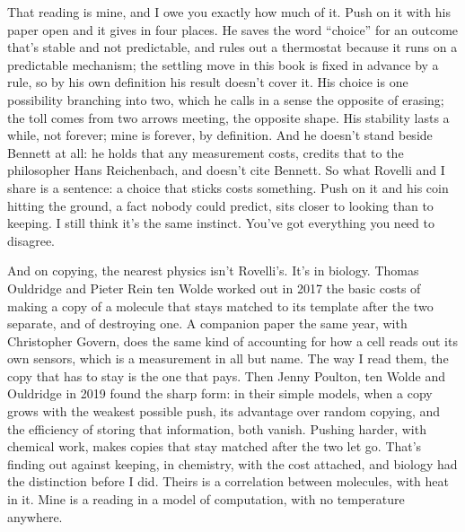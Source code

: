 \documentclass[11pt,twoside]{article}
\theoremstyle{thielethm}
\theoremstyle{thieledef}
\theoremstyle{thieledef}
\theoremstyle{thieledef}
\theoremstyle{thielethm}
\theoremstyle{thieleobs}
\theoremstyle{thielethm}
\begin{document}
That reading is mine, and I owe you exactly how much of it. Push on it with his paper open and it gives in four places. He saves the word ``choice'' for an outcome that's stable and not predictable, and rules out a thermostat because it runs on a predictable mechanism; the settling move in this book is fixed in advance by a rule, so by his own definition his result doesn't cover it. His choice is one possibility branching into two, which he calls in a sense the opposite of erasing; the toll comes from two arrows meeting, the opposite shape. His stability lasts a while, not forever; mine is forever, by definition. And he doesn't stand beside Bennett at all: he holds that any measurement costs, credits that to the philosopher Hans Reichenbach, and doesn't cite Bennett. So what Rovelli and I share is a sentence: a choice that sticks costs something. Push on it and his coin hitting the ground, a fact nobody could predict, sits closer to looking than to keeping. I still think it's the same instinct. You've got everything you need to disagree.

And on copying, the nearest physics isn't Rovelli's. It's in biology. Thomas Ouldridge and Pieter Rein ten Wolde worked out in 2017 the basic costs of making a copy of a molecule that stays matched to its template after the two separate, and of destroying one. A companion paper the same year, with Christopher Govern, does the same kind of accounting for how a cell reads out its own sensors, which is a measurement in all but name. The way I read them, the copy that has to stay is the one that pays. Then Jenny Poulton, ten Wolde and Ouldridge in 2019 found the sharp form: in their simple models, when a copy grows with the weakest possible push, its advantage over random copying, and the efficiency of storing that information, both vanish. Pushing harder, with chemical work, makes copies that stay matched after the two let go. That's finding out against keeping, in chemistry, with the cost attached, and biology had the distinction before I did. Theirs is a correlation between molecules, with heat in it. Mine is a reading in a model of computation, with no temperature anywhere.
\end{document}
